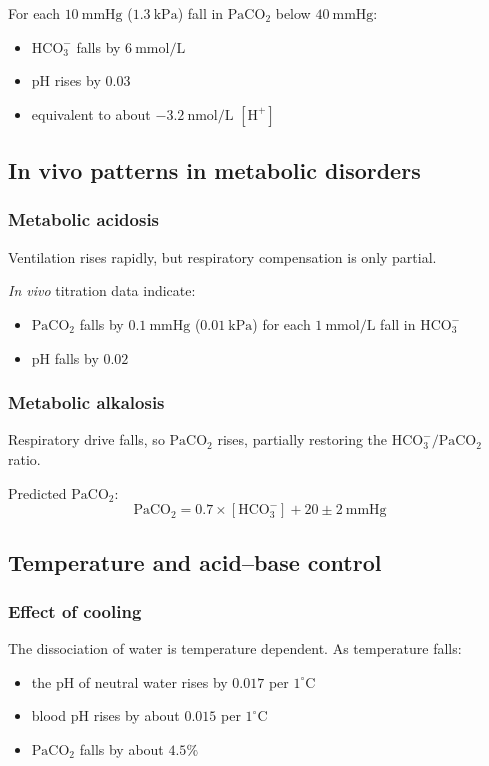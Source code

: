 \documentclass[11pt,a4paper]{article}
\begin{document}
For each \(10~\mathrm{mmHg}\) (\(1.3~\mathrm{kPa}\)) fall in \(\mathrm{PaCO_2}\) below \(40~\mathrm{mmHg}\):
\begin{itemize}
  \item \(\mathrm{HCO_3^-}\) falls by \(6~\mathrm{mmol/L}\)
  \item pH rises by \(0.03\)
  \item equivalent to about \(-3.2~\mathrm{nmol/L}\) \([\mathrm{H^+}]\)
\end{itemize}

\subsection{In vivo patterns in metabolic disorders}

\subsubsection{Metabolic acidosis}
Ventilation rises rapidly, but respiratory compensation is only partial.

\emph{In vivo} titration data indicate:
\begin{itemize}
  \item \(\mathrm{PaCO_2}\) falls by \(0.1~\mathrm{mmHg}\) (\(0.01~\mathrm{kPa}\)) for each \(1~\mathrm{mmol/L}\) fall in \(\mathrm{HCO_3^-}\)
  \item pH falls by \(0.02\)
\end{itemize}

\subsubsection{Metabolic alkalosis}
Respiratory drive falls, so \(\mathrm{PaCO_2}\) rises, partially restoring the \(\mathrm{HCO_3^-}/\mathrm{PaCO_2}\) ratio.

Predicted \(\mathrm{PaCO_2}\):
\[
\mathrm{PaCO_2} = 0.7 \times [\mathrm{HCO_3^-}] + 20 \pm 2~\mathrm{mmHg}
\]

\subsection{Temperature and acid--base control}

\subsubsection{Effect of cooling}
The dissociation of water is temperature dependent. As temperature falls:
\begin{itemize}
  \item the pH of neutral water rises by \(0.017\) per \(1^\circ\mathrm{C}\)
  \item blood pH rises by about \(0.015\) per \(1^\circ\mathrm{C}\)
  \item \(\mathrm{PaCO_2}\) falls by about \(4.5\%\)
\end{itemize}
\end{document}
